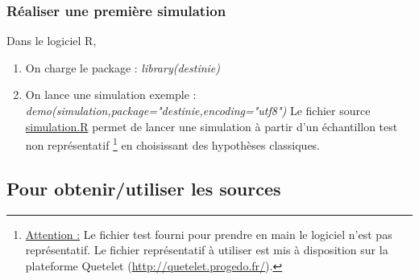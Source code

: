 \subsubsection{Réaliser une première simulation}
Dans le logiciel R,
\begin{enumerate}
\item On charge le package : \textit{library(destinie)}
\item On lance une simulation exemple : \textit{demo(simulation,package="destinie,encoding="utf8")} Le fichier source \url{simulation.R} permet de lancer une simulation à partir d'un échantillon test non représentatif \footnote{\underline{Attention :} Le fichier test fourni pour prendre en main le logiciel n'est pas représentatif. Le fichier représentatif à utiliser est mis à disposition sur la plateforme Quetelet (\url{http://quetelet.progedo.fr/}).} en choisissant des hypothèses classiques.
\end{enumerate}


\subsection{Pour obtenir/utiliser les sources}

